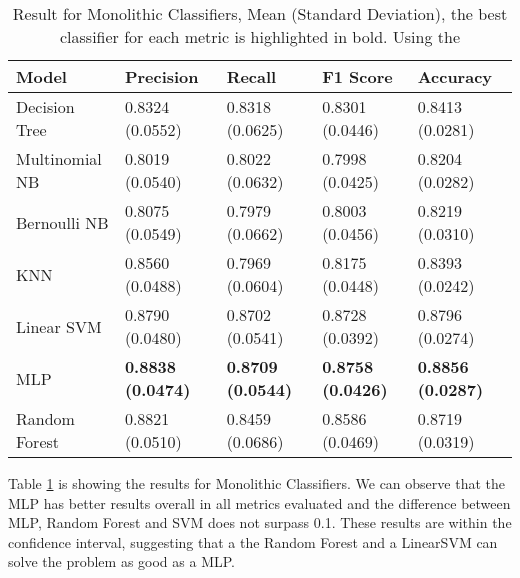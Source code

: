 \begin{table}[h!]
    \centering
    \renewcommand{\arraystretch}{1.8}
    \begin{tabular}{ p{3cm}p{2.8cm}p{2.8cm}p{2.8cm}p{2.8cm} }
        \toprule
        Model & Precision & Recall & F1 Score & Accuracy \\
        \midrule
        Decision Tree &     0.8324 (0.0552) & 0.8318 (0.0625) & 0.8301 (0.0446) & 0.8413 (0.0281) \\
        Multinomial NB &    0.8019 (0.0540) & 0.8022 (0.0632) & 0.7998 (0.0425) & 0.8204 (0.0282) \\
        Bernoulli NB &      0.8075 (0.0549) & 0.7979 (0.0662) & 0.8003 (0.0456) & 0.8219 (0.0310) \\
        KNN &               0.8560 (0.0488) & 0.7969 (0.0604) & 0.8175 (0.0448) & 0.8393 (0.0242) \\
        Linear SVM &        0.8790 (0.0480) & 0.8702 (0.0541) & 0.8728 (0.0392) & 0.8796 (0.0274) \\
        MLP &               \textbf{0.8838 (0.0474)} & \textbf{0.8709 (0.0544)} & \textbf{0.8758 (0.0426)} & \textbf{0.8856 (0.0287)} \\
        Random Forest &     0.8821 (0.0510) & 0.8459 (0.0686) & 0.8586 (0.0469) & 0.8719 (0.0319) \\ [1ex]
        \bottomrule
        \end{tabular}
        \caption{%
        Result for Monolithic Classifiers, Mean (Standard Deviation), the best classifier for each metric is highlighted in bold. Using the %
        }\label{table:result_monolithic}
        \vspace{4ex}
\end{table}

Table \ref{table:result_monolithic} is showing the results for Monolithic Classifiers. We can observe that the MLP has better results overall in all metrics evaluated and the difference between MLP, Random Forest and SVM does not surpass 0.1. These results are within the confidence interval, suggesting that a the Random Forest and a LinearSVM can solve the problem as good as a MLP.